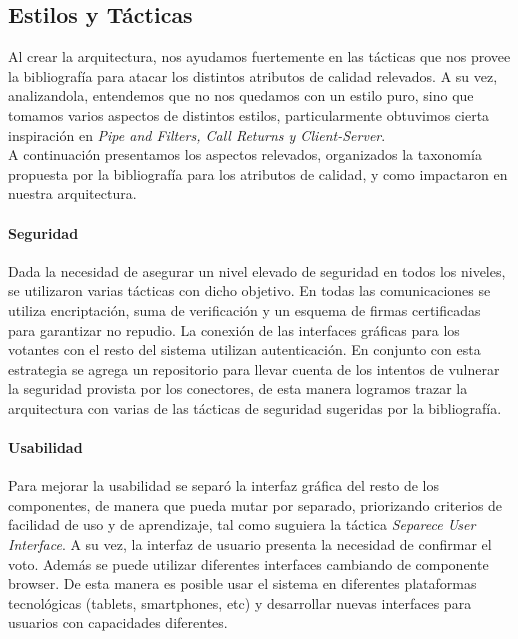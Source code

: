 \subsection{Estilos y Tácticas}

Al crear la arquitectura, nos ayudamos fuertemente en las tácticas que nos provee la bibliografía para atacar los distintos atributos de calidad relevados. A su vez, analizandola, entendemos que no nos quedamos con un estilo puro, sino que tomamos varios aspectos de distintos estilos, particularmente obtuvimos cierta inspiración en \textit{Pipe and Filters, Call Returns y Client-Server}. \\ A continuación presentamos los aspectos relevados, organizados la taxonomía propuesta por la bibliografía para los atributos de calidad, y como impactaron en nuestra arquitectura.
 


\paragraph{Seguridad}
Dada la necesidad de asegurar un nivel elevado de seguridad en todos los niveles, se utilizaron varias tácticas con dicho objetivo. En todas las comunicaciones se utiliza encriptación, suma de verificación y un esquema de firmas certificadas para garantizar no repudio. La conexión de las interfaces gráficas para los votantes con el resto del sistema utilizan autenticación. En conjunto con esta estrategia se agrega un repositorio para llevar cuenta de los intentos de vulnerar la seguridad provista por los conectores, de esta manera logramos trazar la arquitectura con varias de las tácticas de seguridad sugeridas por la bibliografía.

\paragraph{Usabilidad}
Para mejorar la usabilidad se separó la interfaz gráfica del resto de los componentes, de manera que pueda mutar por separado, priorizando criterios de facilidad de uso y de aprendizaje, tal como suguiera la táctica \textit{Separece User Interface}. A su vez, la interfaz de usuario presenta la necesidad de confirmar el voto. Además se puede utilizar diferentes interfaces cambiando de componente browser. De esta manera es posible usar el sistema en diferentes plataformas tecnológicas (tablets, smartphones, etc) y desarrollar nuevas interfaces para usuarios con capacidades diferentes.

